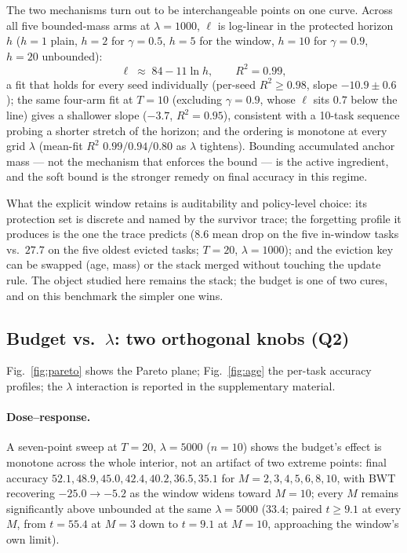 \documentclass[review,12pt,number]{elsarticle}
\begin{document}
The two mechanisms turn out to be interchangeable points on one curve.
Across all five bounded-mass
arms at $\lambda{=}1000$, $\ell$ is log-linear in the protected
horizon $h$ ($h{=}1$ plain, $h{=}2$ for $\gamma{=}0.5$, $h{=}5$ for
the window, $h{=}10$ for $\gamma{=}0.9$, $h{=}20$ unbounded):
\begin{equation}
\label{eq:law}
\ell \;\approx\; 84 - 11\ln h, \qquad R^2 = 0.99,
\end{equation}
a fit that holds for
every seed individually (per-seed $R^2 \geq 0.98$, slope
$-10.9\pm0.6$); the same four-arm fit at $T{=}10$ (excluding
$\gamma{=}0.9$, whose $\ell$ sits $0.7$ below the line) gives a
shallower slope ($-3.7$, $R^2{=}0.95$), consistent with a 10-task
sequence probing a shorter stretch of the horizon; and the ordering is
monotone at every grid $\lambda$ (mean-fit $R^2$
$0.99/0.94/0.80$ as $\lambda$ tightens). Bounding accumulated anchor
mass --- not
the mechanism that enforces the bound --- is the active ingredient,
and the soft bound is the stronger remedy on final accuracy in this
regime.

What the explicit window retains is auditability and
policy-level choice: its protection set is discrete and named by the
survivor trace; the forgetting profile it produces is the one the
trace predicts ($8.6$ mean drop on the five in-window tasks vs.\ $27.7$
on the five oldest evicted tasks; $T{=}20$, $\lambda{=}1000$); and the
eviction key can be swapped (age, mass) or the stack
merged without touching the update rule. The object studied here
remains the stack; the budget is one of two cures, and on this
benchmark the simpler one wins.

\subsection{Budget vs.\ $\lambda$: two orthogonal knobs (Q2)}
\label{sec:exp-knobs}

Fig.~\ref{fig:pareto} shows the Pareto plane; Fig.~\ref{fig:age} the
per-task accuracy profiles; the $\lambda$
interaction is reported in the supplementary material.

\paragraph{Dose--response.}
A seven-point sweep at $T{=}20$, $\lambda{=}5000$ ($n{=}10$) shows the
budget's effect is monotone across the whole interior, not an artifact
of two extreme points: final accuracy $52.1, 48.9, 45.0, 42.4, 40.2,
36.5, 35.1$ for $M{=}2,3,4,5,6,8,10$, with BWT recovering
$-25.0 \to -5.2$ as the window widens toward $M{=}10$; every $M$
remains significantly above unbounded at the same
$\lambda{=}5000$ ($33.4$; paired $t\geq 9.1$ at every $M$,
from $t{=}55.4$ at $M{=}3$ down to $t{=}9.1$ at $M{=}10$, approaching
the window's own limit).
\end{document}
